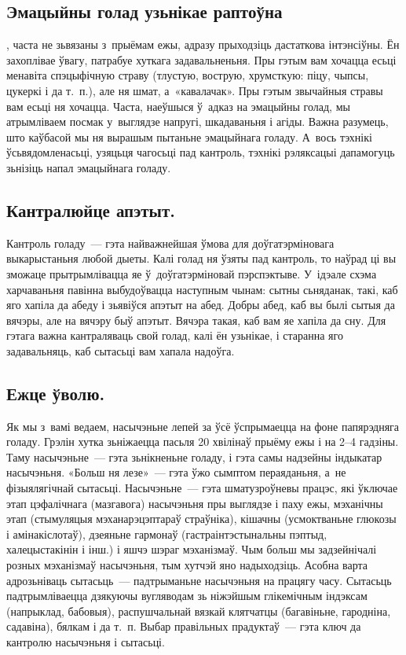 \subsection{Эмацыйны голад узьнікае раптоўна}, часта не зьвязаны з~прыёмам ежы, адразу прыходзіць дастаткова інтэнсіўны.
Ён захоплівае ўвагу, патрабуе хуткага задавальненьня. Пры гэтым вам хочацца есьці менавіта спэцыфічную страву (тлустую, вострую, хрумсткую: піцу, чыпсы, цукеркі і да т.~п.), але ня шмат, а~«кавалачак». Пры гэтым звычайныя стравы вам есьці ня хочацца. Часта, наеўшыся ў~адказ на эмацыйны голад, мы атрымліваем посмак у~выглядзе напругі, шкадаваньня і агіды. Важна разумець, што каўбасой мы ня вырашым пытаньне эмацыйнага голаду. А~вось тэхнікі ўсьвядомленасьці, узяцьця чагосьці пад кантроль, тэхнікі рэляксацыі дапамогуць зьнізіць напал эмацыйнага голаду.

\subsection{Кантралюйце апэтыт.}
Кантроль голаду~--- гэта найважнейшая ўмова для доўгатэрміновага выкарыстаньня любой дыеты. Калі голад ня ўзяты пад кантроль, то наўрад ці вы зможаце прытрымлівацца яе ў~доўгатэрміновай пэрспэктыве. У~ідэале схэма харчаваньня павінна выбудоўвацца наступным чынам: сытны сьняданак, такі, каб яго хапіла да абеду і зьявіўся апэтыт на абед. Добры абед, каб вы былі сытыя да вячэры, але на вячэру быў апэтыт. Вячэра такая, каб вам яе хапіла да сну. Для гэтага важна кантраляваць свой голад, калі ён узьнікае, і старанна яго задавальняць, каб сытасьці вам хапала надоўга.

\subsection{Ежце ўволю.}
Як мы з~вамі ведаем, насычэньне лепей за ўсё ўспрымаецца на фоне папярэдняга голаду. Грэлін хутка зьніжаецца пасьля 20 хвілінаў прыёму ежы і на 2--4 гадзіны. Таму насычэньне~--- гэта зьнікненьне голаду, і гэта самы надзейны індыкатар насычэньня. «Больш ня лезе»~--- гэта ўжо сымптом пераяданьня, а~не фізыялягічнай сытасьці. Насычэньне~--- гэта шматузроўневы працэс, які ўключае этап цэфалічнага (мазгавога) насычэньня пры выглядзе і паху ежы, мэханічны этап (стымуляцыя мэханарэцэптараў страўніка), кішачны (усмоктваньне глюкозы і амінакіслотаў), дзеяньне гармонаў (гастраінтэстынальны пэптыд, халецыстакінін і інш.) і яшчэ шэраг мэханізмаў. Чым больш мы задзейнічалі розных мэханізмаў насычэньня, тым хутчэй яно надыходзіць. Асобна варта адрозьніваць сытасьць~--- падтрыманьне насычэньня на працягу часу. Сытасьць падтрымліваецца дзякуючы вугляводам зь ніжэйшым глікемічным індэксам (напрыклад, бабовыя), распушчальнай вязкай клятчатцы (багавіньне, гародніна, садавіна), бялкам і да т.~п. Выбар правільных прадуктаў~--- гэта ключ да кантролю насычэньня і сытасьці.

